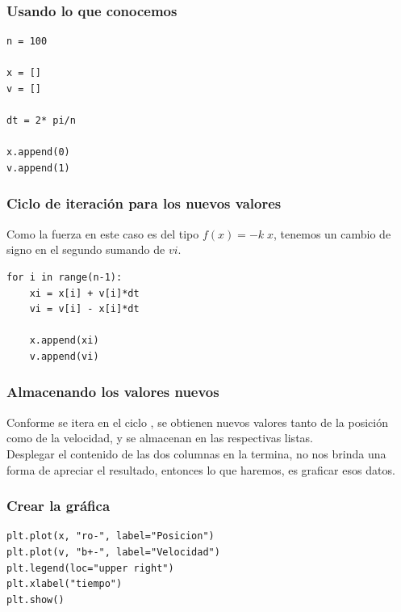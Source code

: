 \begin{frame}[fragile]
\frametitle{Usando lo que conocemos}
\begin{lstlisting}[caption=Información que nos da el enunciado, basicstyle=\linespread{1.2}\ttfamily\small, columns=fullflexible]
n = 100

x = []
v = []

dt = 2* pi/n

x.append(0)
v.append(1)
\end{lstlisting}
\end{frame}
\begin{frame}[fragile]
\frametitle{Ciclo de iteración para los nuevos valores}
Como la fuerza en este caso es del tipo $f(x) = -k \; x$, tenemos un cambio de signo en el segundo sumando de $vi$.
\pause
\begin{lstlisting}[caption=Calculando nuevos valores, basicstyle=\linespread{1.2}\ttfamily\small, columns=fullflexible]
for i in range(n-1):
    xi = x[i] + v[i]*dt
    vi = v[i] - x[i]*dt
    
    x.append(xi)
    v.append(vi)
\end{lstlisting}
\end{frame}
\begin{frame}
\frametitle{Almacenando los valores nuevos}
Conforme se itera en el ciclo , se obtienen nuevos valores tanto de la posición como de la velocidad, y se almacenan en las respectivas listas.
\\
\bigskip
Desplegar el contenido de las dos columnas en la termina, no nos brinda una forma de apreciar el resultado, entonces lo que haremos, es graficar esos datos.
\end{frame}
\begin{frame}[fragile]
\frametitle{Crear la gráfica}
\begin{lstlisting}[caption=Graficando los resultados, basicstyle=\linespread{1.2}\ttfamily\small, columns=fullflexible]
plt.plot(x, "ro-", label="Posicion")
plt.plot(v, "b+-", label="Velocidad")
plt.legend(loc="upper right")
plt.xlabel("tiempo")
plt.show()
\end{lstlisting}
\end{frame}
